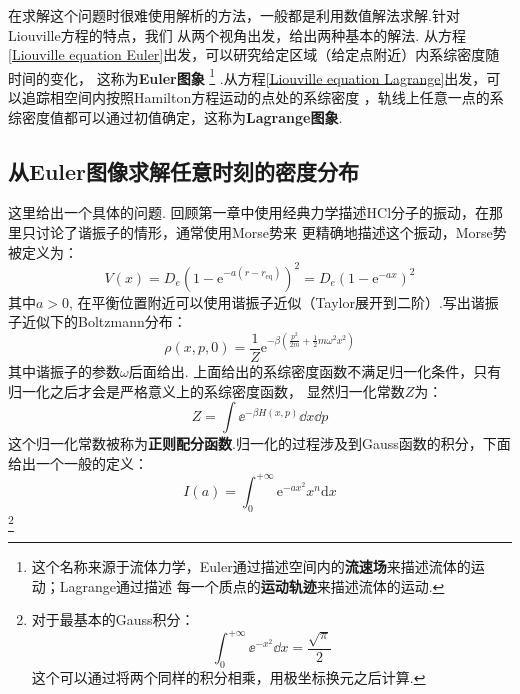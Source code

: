     在求解这个问题时很难使用解析的方法，一般都是利用数值解法求解.针对Liouville方程的特点，我们
    从两个视角出发，给出两种基本的解法.
    从方程\ref{Liouville equation Euler}出发，可以研究给定区域（给定点附近）内系综密度随时间的变化，
    这称为\textbf{Euler图象}
    \footnote{这个名称来源于流体力学，Euler通过描述空间内的\textbf{流速场}来描述流体的运动；Lagrange通过描述
    每一个质点的\textbf{运动轨迹}来描述流体的运动.}
    .从方程\ref{Liouville equation Lagrange}出发，可以追踪相空间内按照Hamilton方程运动的点处的系综密度
    ，轨线上任意一点的系综密度值都可以通过初值确定，这称为\textbf{Lagrange图象}.

    \subsection{从Euler图像求解任意时刻的密度分布}
    这里给出一个具体的问题.
    回顾第一章中使用经典力学描述HCl分子的振动，在那里只讨论了谐振子的情形，通常使用Morse势来
    更精确地描述这个振动，Morse势被定义为：
    \begin{equation}
        V(x) = D_e (1- \mathrm{e}^{-a(r-r_\mathrm{eq})})^2 = D_e(1-\mathrm{e}^{-ax})^2
    \end{equation}
    其中$a>0$, 在平衡位置附近可以使用谐振子近似（Taylor展开到二阶）.写出谐振子近似下的Boltzmann分布：
    \begin{equation}
        \rho(x,p,0) = \frac {1}{Z} \mathrm{e}^{-\beta (\frac {p^2}{2m} + \frac 12 m\omega^2 x^2)} 
    \end{equation}
    其中谐振子的参数$\omega$后面给出.
    上面给出的系综密度函数不满足归一化条件，只有归一化之后才会是严格意义上的系综密度函数，
    显然归一化常数$Z$为：
    \begin{equation}
        Z = \int\ee^{-\beta H(x, p)}\dd x\dd p
    \end{equation}
    这个归一化常数被称为\textbf{正则配分函数}.归一化的过程涉及到Gauss函数的积分，下面给出一个一般的定义：
    \begin{equation}
        I(a) = \int_0^{+\infty} \mathrm{e}^{-ax^2} x^{n} \mathrm{d}x
        \label{1_D Gauss integral}
    \end{equation}
    \footnote{
        对于最基本的Gauss积分：
        \begin{equation}
            \int_{0}^{+\infty}\ee^{-x^2}\dd x = \frac{\sqrt{\pi}}{2}
        \end{equation}
        这个可以通过将两个同样的积分相乘，用极坐标换元之后计算.
    }

